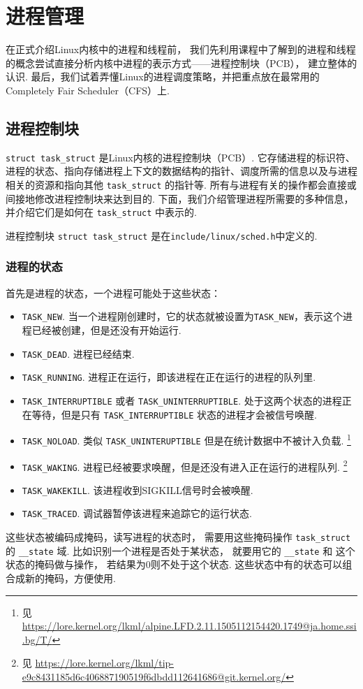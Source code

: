 \section{进程管理}
在正式介绍Linux内核中的进程和线程前，
我们先利用课程中了解到的进程和线程的概念尝试直接分析内核中进程的表示方式——进程控制块（PCB），
建立整体的认识.
最后，我们试着弄懂Linux的进程调度策略，并把重点放在最常用的
Completely Fair Scheduler（CFS）上.

\subsection{进程控制块}
\lstinline{struct task_struct} 是Linux内核的进程控制块（PCB）.
它存储进程的标识符、进程的状态、指向存储进程上下文的数据结构的指针、调度所需的信息以及与进程相关的资源和指向其他 \lstinline{task_struct} 的指针等.
所有与进程有关的操作都会直接或间接地修改进程控制块来达到目的.
下面，我们介绍管理进程所需要的多种信息，并介绍它们是如何在 \lstinline{task_struct} 中表示的.

\begin{readsrcbox}{进程控制块}
	\lstinline{struct task_struct} 是在\lstinline{include/linux/sched.h}中定义的.
\end{readsrcbox}

\subsubsection{进程的状态} \label{process state}
首先是进程的状态，一个进程可能处于这些状态：
\begin{itemize}
	\item \lstinline{TASK_NEW}.
	      当一个进程刚创建时，它的状态就被设置为\lstinline{TASK_NEW}，表示这个进程已经被创建，但是还没有开始运行.
	\item \lstinline{TASK_DEAD}.
	      进程已经结束.
	\item \lstinline{TASK_RUNNING}.
	      进程正在运行，即该进程在正在运行的进程的队列里.
	\item \lstinline{TASK_INTERRUPTIBLE} 或者 \lstinline{TASK_UNINTERRUPTIBLE}.
	      处于这两个状态的进程正在等待，但是只有 \lstinline{TASK_INTERRUPTIBLE} 状态的进程才会被信号唤醒.
	\item \lstinline{TASK_NOLOAD}.
	      类似 \lstinline{TASK_UNINTERUPTIBLE} 但是在统计数据中不被计入负载.
	      \footnote{见 \url{https://lore.kernel.org/lkml/alpine.LFD.2.11.1505112154420.1749@ja.home.ssi.bg/T/}}
	\item \lstinline{TASK_WAKING}.
	      进程已经被要求唤醒，但是还没有进入正在运行的进程队列.
	      \footnote{见 \url{https://lore.kernel.org/lkml/tip-e9c8431185d6c406887190519f6dbdd112641686@git.kernel.org/}}
	\item \lstinline{TASK_WAKEKILL}.
	      该进程收到SIGKILL信号时会被唤醒.
	\item \lstinline{TASK_TRACED}.
	      调试器暂停该进程来追踪它的运行状态.
\end{itemize}
这些状态被编码成掩码，读写进程的状态时，
需要用这些掩码操作 \lstinline{task_struct} 的 \lstinline{__state} 域.
比如识别一个进程是否处于某状态，
就要用它的 \lstinline{__state} 和 这个状态的掩码做与操作，
若结果为0则不处于这个状态.
这些状态中有的状态可以组合成新的掩码，方便使用.

